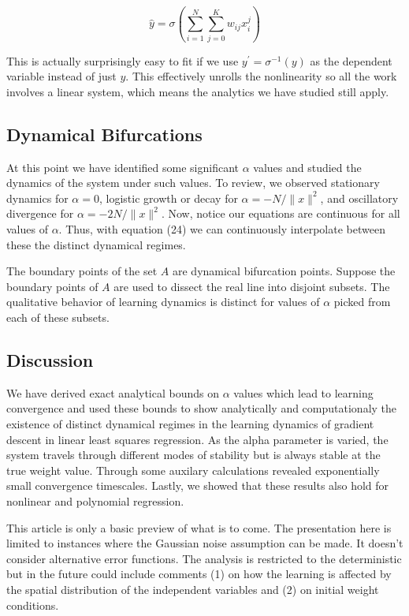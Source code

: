 \documentclass[]{article}
\begin{document}
\[
\hat{y} = \sigma\left(  \sum\limits_{i=1}^N\sum\limits^{K}_{j=0}  w_{ij}x_i^j\right)
\]

This is actually surprisingly easy to fit if we use
\(y^\prime= \sigma^{-1}(y)\) as the dependent variable instead of just
\(y\). This effectively unrolls the nonlinearity so all the work
involves a linear system, which means the analytics we have studied
still apply.

\subsection{Dynamical Bifurcations}\label{dynamical-bifurcations}

At this point we have identified some significant \(\alpha\) values and
studied the dynamics of the system under such values. To review, we
observed stationary dynamics for \(\alpha=0\), logistic growth or decay
for \(\alpha = -N/{\| x \|^2}\), and oscillatory divergence for
\(\alpha = -2N/{\|x\|^2}\). Now, notice our equations are continuous for
all values of \(\alpha\). Thus, with equation (24) we can continuously
interpolate between these the distinct dynamical regimes.

The boundary points of the set \(A\) are dynamical bifurcation points.
Suppose the boundary points of \(A\) are used to dissect the real line
into disjoint subsets. The qualitative behavior of learning dynamics is
distinct for values of \(\alpha\) picked from each of these subsets.

\subsection{Discussion}\label{discussion}

We have derived exact analytical bounds on \(\alpha\) values which lead
to learning convergence and used these bounds to show analytically and
computationaly the existence of distinct dynamical regimes in the
learning dynamics of gradient descent in linear least squares
regression. As the alpha parameter is varied, the system travels through
different modes of stability but is always stable at the true weight
value. Through some auxilary calculations revealed exponentially small
convergence timescales. Lastly, we showed that these results also hold
for nonlinear and polynomial regression.

This article is only a basic preview of what is to come. The
presentation here is limited to instances where the Gaussian noise
assumption can be made. It doesn't consider alternative error functions.
The analysis is restricted to the deterministic but in the future could
include comments (1) on how the learning is affected by the spatial
distribution of the independent variables and (2) on initial weight
conditions.
\end{document}
